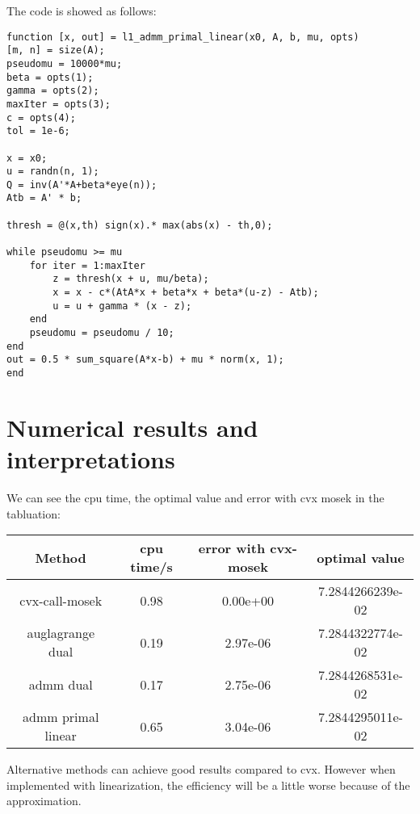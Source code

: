 \documentclass[11pt, oneside]{article}   	%
\begin{document}
The code is showed as follows:
\lstset{
 frame=single, 
breaklines=true,
language=MATLAB,
 }
\begin{lstlisting}
function [x, out] = l1_admm_primal_linear(x0, A, b, mu, opts)
[m, n] = size(A);
pseudomu = 10000*mu;
beta = opts(1);
gamma = opts(2);
maxIter = opts(3);
c = opts(4);
tol = 1e-6; 

x = x0;
u = randn(n, 1);
Q = inv(A'*A+beta*eye(n));
Atb = A' * b;

thresh = @(x,th) sign(x).* max(abs(x) - th,0);

while pseudomu >= mu
    for iter = 1:maxIter
        z = thresh(x + u, mu/beta);
        x = x - c*(AtA*x + beta*x + beta*(u-z) - Atb);
        u = u + gamma * (x - z); 
    end
    pseudomu = pseudomu / 10;  
end
out = 0.5 * sum_square(A*x-b) + mu * norm(x, 1);
end

\end{lstlisting}

\section{Numerical results and interpretations}
We can see the cpu time, the optimal value and error with cvx mosek in the tabluation:

\begin{table}[h]
  \centering
  \begin{tabular}{c|ccc}
  \hline
  Method&cpu time/s&error with cvx-mosek&optimal value\\
  \hline
  cvx-call-mosek&0.98&0.00e+00&7.2844266239e-02\\
  auglagrange dual&0.19&2.97e-06&7.2844322774e-02\\
  admm dual&0.17&2.75e-06&7.2844268531e-02\\
  admm primal linear&0.65&3.04e-06&7.2844295011e-02\\
  \hline
  \end{tabular}
\end{table}

Alternative methods can achieve good results compared to cvx. However when implemented with linearization, the efficiency will be a little worse because of the approximation.
\end{document}
